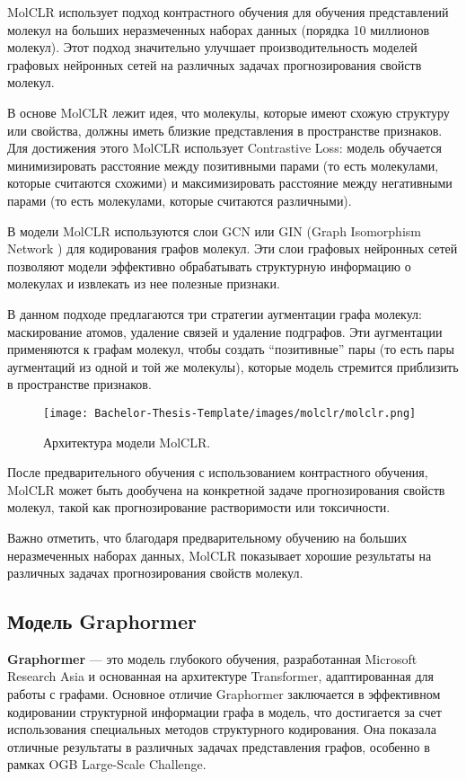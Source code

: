 MolCLR использует подход контрастного обучения для обучения представлений молекул на больших неразмеченных наборах данных (порядка 10 миллионов молекул). Этот подход значительно улучшает производительность моделей графовых нейронных сетей на различных задачах прогнозирования свойств молекул.

В основе MolCLR лежит идея, что молекулы, которые имеют схожую структуру или свойства, должны иметь близкие представления в пространстве признаков. Для достижения этого MolCLR использует Contrastive Loss: модель обучается минимизировать расстояние между позитивными парами (то есть молекулами, которые считаются схожими) и максимизировать расстояние между негативными парами (то есть молекулами, которые считаются различными).

В модели MolCLR используются слои GCN \cite{kipf2017semisupervised} или GIN (Graph Isomorphism Network \cite{kim2020understanding}) для кодирования графов молекул. Эти слои графовых нейронных сетей позволяют модели эффективно обрабатывать структурную информацию о молекулах и извлекать из нее полезные признаки.

В данном подходе предлагаются три стратегии аугментации графа молекул: маскирование атомов, удаление связей и удаление подграфов. Эти аугментации применяются к графам молекул, чтобы создать “позитивные” пары (то есть пары аугментаций из одной и той же молекулы), которые модель стремится приблизить в пространстве признаков. 

\begin{figure}[!h]
    \centering
    \texttt{[image: Bachelor-Thesis-Template/images/molclr/molclr.png]}
    \caption{\small Архитектура модели MolCLR.}
    \label{fig:MolCLR}
\end{figure}

После предварительного обучения с использованием контрастного обучения, MolCLR может быть дообучена на конкретной задаче прогнозирования свойств молекул, такой как прогнозирование растворимости или токсичности.

Важно отметить, что благодаря предварительному обучению на больших неразмеченных наборах данных, MolCLR показывает хорошие результаты на различных задачах прогнозирования свойств молекул.

\subsection{Модель Graphormer}
\textbf{Graphormer} \cite{graphormer} — это модель глубокого обучения, разработанная Microsoft Research Asia и основанная на архитектуре Transformer, адаптированная для работы с графами. Основное отличие Graphormer заключается в эффективном кодировании структурной информации графа в модель, что достигается за счет использования специальных методов структурного кодирования. Она показала отличные результаты в различных задачах представления графов, особенно в рамках OGB Large-Scale Challenge.

